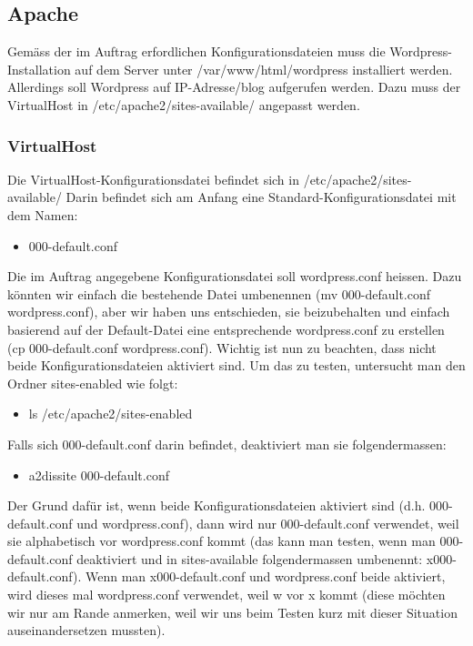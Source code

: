 \documentclass{article}
\begin{document}
	\subsection{Apache}
	Gemäss der im Auftrag erfordlichen Konfigurationsdateien muss die Wordpress-Installation auf dem Server unter /var/www/html/wordpress installiert werden.
	Allerdings soll Wordpress auf IP-Adresse/blog aufgerufen werden. Dazu muss der VirtualHost in /etc/apache2/sites-available/ angepasst werden.
	\subsubsection{VirtualHost}
	Die VirtualHost-Konfigurationsdatei befindet sich in /etc/apache2/sites-available/
	Darin befindet sich am Anfang eine Standard-Konfigurationsdatei mit dem Namen:
	\begin{itemize}
		\item 000-default.conf
	\end{itemize}		
	Die im Auftrag angegebene Konfigurationsdatei soll wordpress.conf heissen. Dazu könnten wir einfach die bestehende Datei umbenennen (mv 000-default.conf wordpress.conf), aber wir haben uns entschieden, sie beizubehalten und einfach basierend auf der Default-Datei eine entsprechende wordpress.conf zu erstellen (cp 000-default.conf wordpress.conf). Wichtig ist nun zu beachten, dass nicht beide Konfigurationsdateien aktiviert sind. Um das zu testen, untersucht man den Ordner sites-enabled wie folgt:
	\begin{itemize}
		\item ls /etc/apache2/sites-enabled
	\end{itemize}
	Falls sich  000-default.conf darin befindet, deaktiviert man sie folgendermassen:
	\begin{itemize}
		\item a2dissite  000-default.conf
	\end{itemize}
	Der Grund dafür ist, wenn beide Konfigurationsdateien aktiviert sind (d.h. 000-default.conf und wordpress.conf), dann wird nur 000-default.conf verwendet, weil sie alphabetisch vor wordpress.conf kommt (das kann man testen, wenn man 000-default.conf deaktiviert und in sites-available folgendermassen umbenennt: x000-default.conf). Wenn man x000-default.conf und wordpress.conf beide aktiviert, wird dieses mal wordpress.conf verwendet, weil w vor x kommt (diese möchten wir nur am Rande anmerken, weil wir uns beim Testen kurz mit dieser Situation auseinandersetzen mussten).
\end{document}
